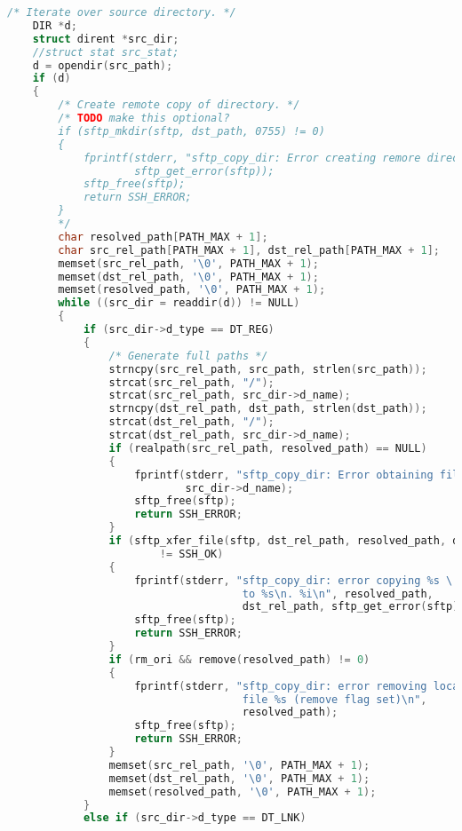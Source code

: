 \begin{lstlisting}[language=C,caption={Signature and schematic implementation of remote execution methods.\label{code:libssh}}]
    /* Iterate over source directory. */
    DIR *d;
    struct dirent *src_dir;
    //struct stat src_stat;
    d = opendir(src_path);
    if (d)
    {
        /* Create remote copy of directory. */
        /* TODO make this optional?
        if (sftp_mkdir(sftp, dst_path, 0755) != 0)
        {
            fprintf(stderr, "sftp_copy_dir: Error creating remore directory %d\n",
                    sftp_get_error(sftp));
            sftp_free(sftp);
            return SSH_ERROR;
        }
        */
        char resolved_path[PATH_MAX + 1];
        char src_rel_path[PATH_MAX + 1], dst_rel_path[PATH_MAX + 1];
        memset(src_rel_path, '\0', PATH_MAX + 1);
        memset(dst_rel_path, '\0', PATH_MAX + 1);
        memset(resolved_path, '\0', PATH_MAX + 1);
        while ((src_dir = readdir(d)) != NULL)
        {
            if (src_dir->d_type == DT_REG)
            {
                /* Generate full paths */
                strncpy(src_rel_path, src_path, strlen(src_path));
                strcat(src_rel_path, "/");
                strcat(src_rel_path, src_dir->d_name);
                strncpy(dst_rel_path, dst_path, strlen(dst_path));
                strcat(dst_rel_path, "/");
                strcat(dst_rel_path, src_dir->d_name);
                if (realpath(src_rel_path, resolved_path) == NULL)
                {
                    fprintf(stderr, "sftp_copy_dir: Error obtaining file's real path: %s\n",
                            src_dir->d_name);
                    sftp_free(sftp);
                    return SSH_ERROR;
                }
                if (sftp_xfer_file(sftp, dst_rel_path, resolved_path, dir_size)
                        != SSH_OK)
                {
                    fprintf(stderr, "sftp_copy_dir: error copying %s \
                                     to %s\n. %i\n", resolved_path,
                                     dst_rel_path, sftp_get_error(sftp));
                    sftp_free(sftp);
                    return SSH_ERROR;
                }
                if (rm_ori && remove(resolved_path) != 0)
                {
                    fprintf(stderr, "sftp_copy_dir: error removing local \
                                     file %s (remove flag set)\n",
                                     resolved_path);
                    sftp_free(sftp);
                    return SSH_ERROR;
                }
                memset(src_rel_path, '\0', PATH_MAX + 1);
                memset(dst_rel_path, '\0', PATH_MAX + 1);
                memset(resolved_path, '\0', PATH_MAX + 1);
            }
            else if (src_dir->d_type == DT_LNK)

\end{lstlisting}
